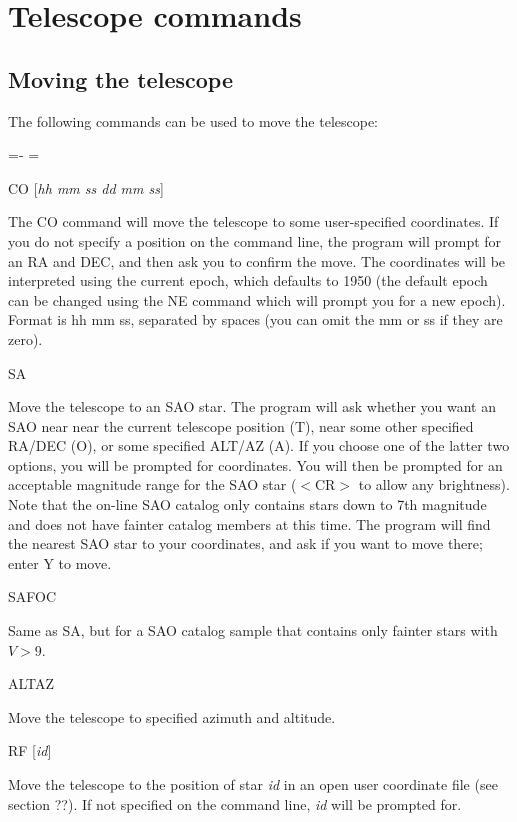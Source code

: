 \documentclass[10pt]{report}
\newenvironment{hanging}{
	\begin{list}{}{
		\labelsep=0pt
		\labelwidth=0pt
		\listparindent=0pt
		\itemindent=-\leftmargini
		\leftmargin=\leftmargini
	}
}{
	\end{list}
}
\begin{document}
\section{Telescope commands}

\subsection{Moving the telescope} 

The following commands can be used to move the telescope:

\begin{hanging}
\item {CO [{\it hh mm ss dd mm ss}]}

The CO command will move the telescope to some user-specified coordinates. 
If you do not specify a position on the command line, the program
will prompt for an RA and DEC, and then ask you to confirm the
move. The coordinates will be interpreted using the current epoch,
which defaults to 1950 (the default epoch can be changed using the
NE command which will prompt you for a new epoch). Format is hh mm ss,
separated by spaces (you can omit the mm or ss if they are zero).

\item{SA}

Move the telescope to an SAO star. The program will ask whether you
want an SAO near near the current telescope position (T), near
some other specified RA/DEC (O), or some specified ALT/AZ (A). If
you choose one of the latter two options, you will be prompted for
coordinates. You will then be prompted for an acceptable magnitude 
range for the SAO star ($<$CR$>$ to allow any brightness). Note that
the on-line SAO catalog only contains stars down to 7th magnitude
and does not have fainter catalog members at this time.
The program will find the nearest SAO star to your coordinates, and
ask if you want to move there; enter Y to move.

\item{SAFOC}

Same as SA, but for a SAO catalog sample that contains only fainter
stars with $V>9$.

\item{ALTAZ}

Move the telescope to specified azimuth and altitude.

\item{RF [{\it id}]}

Move the telescope to the position of star {\it id} in an open user
coordinate file (see section ??). If not specified on the command line,
{\it id} will be prompted for.


\end{hanging}
\end{document}
